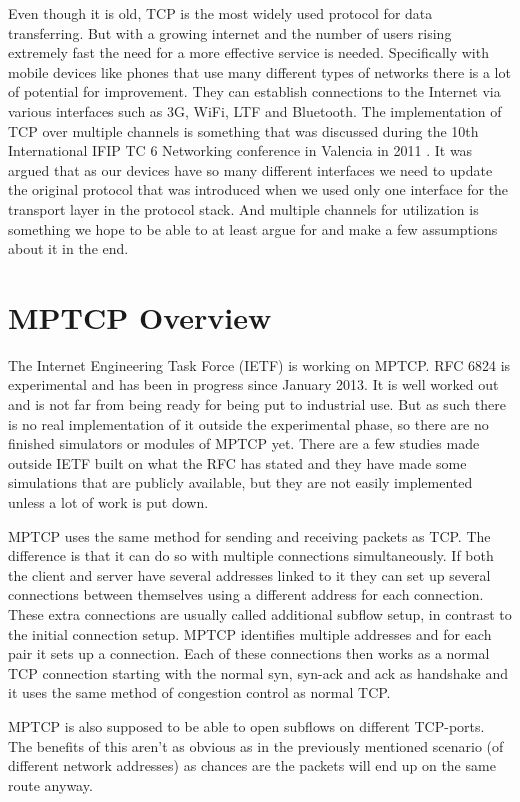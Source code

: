 \documentclass[11pt,twocolumn]{article}
\begin{document}
Even though it is old, TCP is the most widely used protocol for data transferring. But with a growing internet and the number of users rising extremely fast the need for a more effective service is needed. Specifically with mobile devices like phones that use many different types of networks there is a lot of potential for improvement. They can establish connections to the Internet via various interfaces such as 3G, WiFi, LTF and Bluetooth. The implementation of TCP over multiple channels is something that was discussed during the 10th International IFIP TC 6 Networking conference in Valencia in 2011 \cite{RFC6824}. It was argued that as our devices have so many different interfaces we need to update the original protocol that was introduced when we used only one interface for the transport layer in the protocol stack. And multiple channels for utilization is something we hope to be able to at least argue for and make a few assumptions about it in the end.

\section{MPTCP Overview}
The Internet Engineering Task Force (IETF) is working on MPTCP. RFC 6824 is experimental and has been in progress since January 2013. It is well worked out and is not far from being ready for being put to industrial use. But as such there is no real implementation of it outside the experimental phase, so there are no finished simulators or modules of MPTCP yet. There are a few studies made outside IETF built on what the RFC has stated and they have made some simulations that are publicly available, but they are not easily implemented unless a lot of work is put down.

MPTCP uses the same method for sending and receiving packets as TCP. The difference is that it can do so with multiple connections simultaneously. If both the client and server have several addresses linked to it they can set up several connections between themselves using a different address for each connection. These extra connections are usually called additional subflow setup, in contrast to the initial connection setup. MPTCP identifies multiple addresses and for each pair it sets up a connection. Each of these connections then works as a normal TCP connection starting with the normal syn, syn-ack and ack as handshake and it uses the same method of congestion control as normal TCP.

MPTCP is also supposed to be able to open subflows on different TCP-ports. The benefits of this  aren't as obvious as in the previously mentioned scenario (of different network addresses) as chances are the packets will end up on the same route anyway. 
\end{document}
